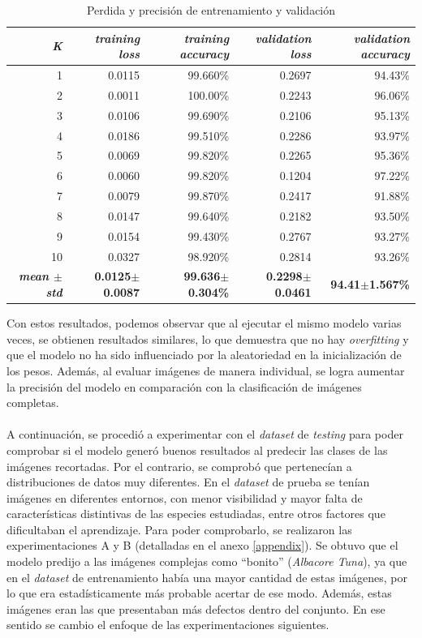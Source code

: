 \begin{table}[h!]
\footnotesize
\centering
\begin{tabular}{|r|r|r|r|r|}
\hline
\textit{K} & \textit{training loss} & \textit{training accuracy} & \textit{validation loss} & \textit{validation accuracy} \\ \hline
1    & 0.0115      & 99.660\%    & 0.2697    & 94.43\%  \\ \hline
2    & 0.0011      & 100.00\%   & 0.2243    & 96.06\%  \\ \hline
3    & 0.0106      & 99.690\%    & 0.2106    & 95.13\%  \\ \hline
4    & 0.0186      & 99.510\%    & 0.2286    & 93.97\%  \\ \hline
5    & 0.0069      & 99.820\%    & 0.2265    & 95.36\%  \\ \hline
6    & 0.0060      & 99.820\%    & 0.1204    & 97.22\%  \\ \hline
7    & 0.0079      & 99.870\%    & 0.2417    & 91.88\%  \\ \hline
8    & 0.0147      & 99.640\%    & 0.2182    & 93.50\%  \\ \hline
9    & 0.0154      & 99.430\%    & 0.2767    & 93.27\%  \\ \hline
10   & 0.0327      & 98.920\%    & 0.2814    & 93.26\%  \\ \hline
\textbf{\textit{mean $\pm$ std}}     & \textbf{0.0125$\pm$0.0087}      & \textbf{99.636$\pm$0.304\%}    & \textbf{0.2298$\pm$0.0461}    & \textbf{94.41$\pm$1.567\%}  \\ \hline
\end{tabular}
\caption{Perdida y precisión de entrenamiento y validación}
\label{table:KFolds1}
\end{table}
Con estos resultados, podemos observar que al ejecutar el mismo modelo varias veces, se obtienen resultados similares, lo que demuestra que no hay \textit{overfitting} y que el modelo no ha sido influenciado por la aleatoriedad en la inicialización de los pesos. Además, al evaluar imágenes de manera individual, se logra aumentar la precisión del modelo en comparación con la clasificación de imágenes completas.
\\\\
A continuación, se procedió a experimentar con el \textit{dataset} de \textit{testing} para poder comprobar si el modelo generó buenos resultados al predecir las clases de las imágenes recortadas. Por el contrario, se comprobó que pertenecían a distribuciones de datos muy diferentes. En el \textit{dataset} de prueba se tenían imágenes en diferentes entornos, con menor visibilidad y mayor falta de características distintivas de las especies estudiadas, entre otros factores que dificultaban el aprendizaje. Para poder comprobarlo, se realizaron las experimentaciones A y B (detalladas en el anexo \ref{appendix}). Se obtuvo que el modelo predijo a las imágenes complejas como ``bonito'' (\textit{Albacore Tuna}), ya que en el \textit{dataset} de entrenamiento había una mayor cantidad de estas imágenes, por lo que era estadísticamente más probable acertar de ese modo. Además, estas imágenes eran las que presentaban más defectos dentro del conjunto. En ese sentido se cambio el enfoque de las experimentaciones siguientes.
